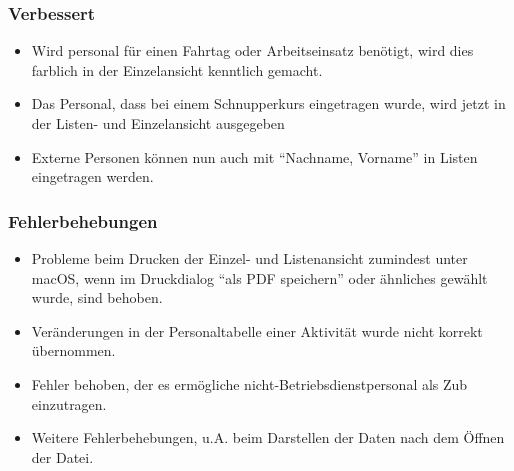 \subsubsection{Verbessert}
\begin{itemize}
  \item
  Wird personal für einen Fahrtag oder Arbeitseinsatz benötigt, wird dies farblich in der Einzelansicht kenntlich gemacht.
  \item
  Das Personal, dass bei einem Schnupperkurs eingetragen wurde, wird jetzt in der Listen- und Einzelansicht ausgegeben
  \item
  Externe Personen können nun auch mit "`Nachname, Vorname"' in Listen eingetragen werden.
\end{itemize}

\subsubsection{Fehlerbehebungen}
\begin{itemize}
  \item
  Probleme beim Drucken der Einzel- und Listenansicht zumindest unter macOS, wenn im Druckdialog "`als PDF speichern"' oder ähnliches gewählt wurde, sind behoben.
  \item
  Veränderungen in der Personaltabelle einer Aktivität wurde nicht korrekt übernommen.
  \item
  Fehler behoben, der es ermögliche nicht-Betriebsdienstpersonal als Zub einzutragen.
  \item
  Weitere Fehlerbehebungen, u.A. beim Darstellen der Daten nach dem Öffnen der Datei.
\end{itemize}
